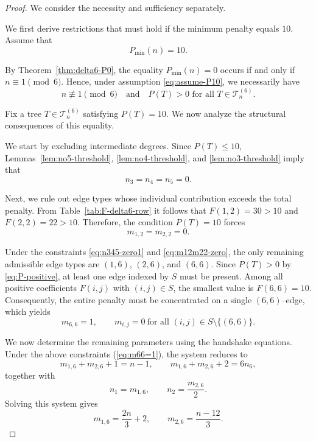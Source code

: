 \documentclass[preprint,12pt]{elsarticle}
\begin{document}
\begin{proof}
We consider the necessity and sufficiency separately.

\medskip
We first derive restrictions that must hold if the minimum penalty equals $10$.
Assume that
\begin{equation}
P_{\min}(n)=10.
\label{eq:assume-P10}
\end{equation}

By Theorem~\ref{thm:delta6-P0}, the equality $P_{\min}(n)=0$ occurs if and only if
$n\equiv 1\pmod 6$.
Hence, under assumption \eqref{eq:assume-P10}, we necessarily have
\begin{equation}
n\not\equiv 1\pmod 6
\quad\text{and}\quad
P(T)>0 \text{ for all } T\in\mathcal{T}_n^{(6)}.
\label{eq:P-positive}
\end{equation}

Fix a tree $T\in\mathcal{T}_n^{(6)}$ satisfying $P(T)=10$.
We now analyze the structural consequences of this equality.

\medskip
We start by excluding intermediate degrees.
Since $P(T)\le 10$, Lemmas~\ref{lem:no5-threshold},
\ref{lem:no4-threshold}, and \ref{lem:no3-threshold} imply that
\begin{equation}
n_3=n_4=n_5=0.
\label{eq:n345-zero1}
\end{equation}

\medskip
Next, we rule out edge types whose individual contribution exceeds the total
penalty.
From Table~\ref{tab:F-delta6-row} it follows that
$F(1,2)=30>10$ and $F(2,2)=22>10$.
Therefore, the condition $P(T)=10$ forces
\begin{equation}
m_{1,2}=m_{2,2}=0.
\label{eq:m12m22-zero}
\end{equation}

\medskip
Under the constraints \eqref{eq:n345-zero1} and \eqref{eq:m12m22-zero},
the only remaining admissible edge types are $(1,6)$, $(2,6)$, and $(6,6)$.
Since $P(T)>0$ by \eqref{eq:P-positive}, at least one edge indexed by $S$ must be
present.
Among all positive coefficients $F(i,j)$ with $(i,j)\in S$, the smallest value is
$F(6,6)=10$.
Consequently, the entire penalty must be concentrated on a single $(6,6)$–edge,
which yields
\begin{equation}
m_{6,6}=1,
\qquad
m_{i,j}=0 \ \text{for all }(i,j)\in S\setminus\{(6,6)\}.
\label{eq:m66=1}
\end{equation}

\medskip
We now determine the remaining parameters using the handshake equations.
Under the above constraints (\ref{eq:m66=1}), the system reduces to
\[
m_{1,6}+m_{2,6}+1=n-1,
\qquad
m_{1,6}+m_{2,6}+2=6n_6,
\]
together with
\[
n_1=m_{1,6},
\qquad
n_2=\frac{m_{2,6}}{2}.
\]
Solving this system gives
\begin{equation}
m_{1,6}=\frac{2n}{3}+2,
\qquad
m_{2,6}=\frac{n-12}{3}.
\label{eq:m16m26-final}
\end{equation}


\end{proof}
\end{document}
